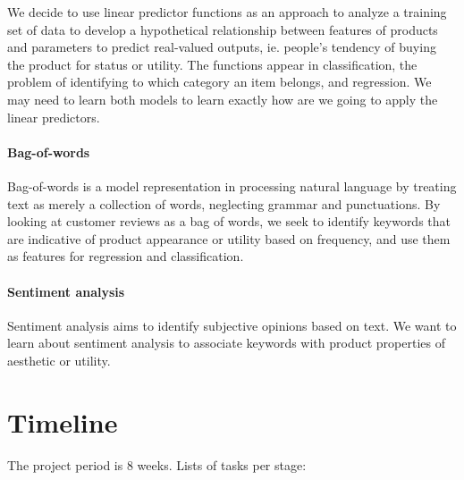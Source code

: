 \documentclass[dvips,12pt]{article}
\begin{document}
We decide to use linear predictor functions as an approach to analyze a training set of data to develop a hypothetical relationship between features of products and parameters to predict real-valued outputs, ie. people's tendency of buying the product for status or utility. The functions appear in classification, the problem of identifying to which category an item belongs, and regression. We may need to learn both models to learn exactly how are we going to apply the linear predictors.
	
\paragraph{Bag-of-words}
Bag-of-words is a model representation in processing natural language by treating text as merely a collection of words, neglecting grammar and punctuations. By looking at customer reviews as a bag of words, we seek to identify keywords that are indicative of product appearance or utility based on frequency, and use them as features for regression and classification.
	
\paragraph{Sentiment analysis}
Sentiment analysis aims to identify subjective opinions based on text. We want to learn about sentiment analysis to associate keywords with product properties of aesthetic or utility.

\section{Timeline}
The project period is 8 weeks. Lists of tasks per stage:
\end{document}
